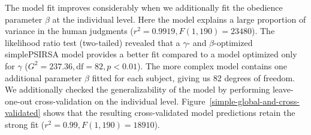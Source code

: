 \documentclass[11pt,a4paper]{article}
\begin{document}

 

The model fit improves considerably when we additionally fit the obedience parameter $\beta$ at the individual level. 
Here the model explains a large proportion of variance in the human judgments ($r^2 = 0.9919, F(1,190) = 23480$). The likelihood ratio test (two-tailed) revealed that a $\gamma$- and $\beta$-optimized simplePSIRSA model provides a better fit compared to a model optimized only for $\gamma$ ($G^2 = 237.36, \textrm{df} = 82, p < 0.01$). The more complex model contains one additional parameter $\beta$ fitted for each subject, giving us 82 degrees of freedom. We additionally checked the generalizability of the model by performing leave-one-out cross-validation on the individual level. Figure~\ref{simple-global-and-cross-validated} shows that the resulting cross-validated model predictions retain the strong fit ($r^2 = 0.99, F(1,190) = 18910$).

\end{document}
